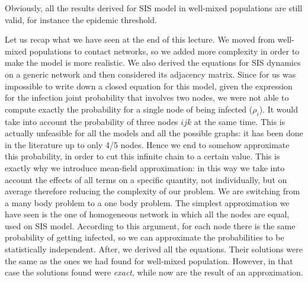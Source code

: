 \documentclass[../main/main.tex]{subfiles}
\begin{document}
Obviously, all the results derived for SIS model in well-mixed populations are still valid, for instance the epidemic threshold.

\begin{remark}
Let us recap what we have seen at the end of this lecture.
We moved from well-mixed populations to contact networks, so we added more complexity in order to make the model is more realistic. We also derived the equations for SIS dynamics on a generic network and then considered its adjacency matrix. Since for us was impossible to write down a closed equation for this model, given the expression for the infection joint probability that involves two nodes, we were not able to compute exactly the probability for a single node of being infected ($\rho_i$). It would take into account the probability of three nodes \( i j k \) at the same time. This is actually unfeasible for all the models and all the possible graphs: it has been done in the literature up to only 4/5 nodes. Hence we end to somehow approximate this probability, in order to cut this infinite chain to a certain value. This is exactly why we introduce mean-field approximation: in this way we take into account the effects of all terms on a specific quantity, not individually, but on average therefore reducing the complexity of our problem. We are switching from a many body problem to a one body problem.
The simplest approximation we have seen is the one of homogeneous network in which all the nodes are equal, used on SIS model. According to this argument, for each node there is the same probability of getting infected, so we can approximate the probabilities to be statistically independent. After, we derived all the equations. Their solutions were the same as the ones we had found for well-mixed population. However, in that case the solutions found were \textit{exact}, while now are the result of an approximation.
\end{remark}
\end{document}
